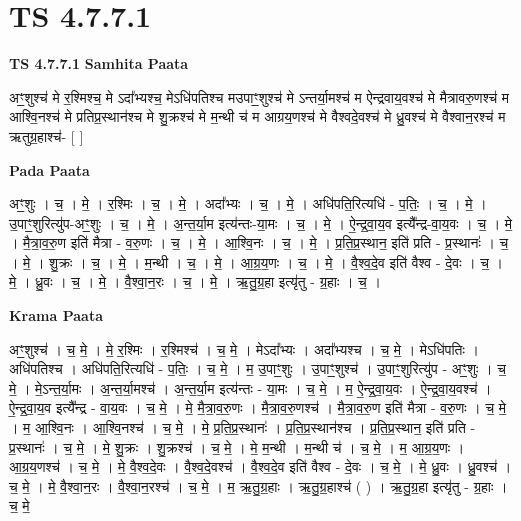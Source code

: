 \documentclass[17pt]{extarticle}
\begin{document}
\section{ TS 4.7.7.1 }

\textbf{TS 4.7.7.1 } \newline
\textbf{Samhita Paata} \newline

अꣳ॒॒शुश्च॑ मे र॒श्मिश्च॒ मे ऽदा᳚भ्यश्च॒ मेऽधि॑पतिश्च मउपाꣳ॒॒शुश्च॑ मे ऽन्तर्या॒मश्च॑ म ऐन्द्रवाय॒वश्च॑ मे मैत्रावरु॒णश्च॑ म आश्वि॒नश्च॑ मे प्रतिप्र॒स्थान॑श्च मे शु॒क्रश्च॑ मे म॒न्थी च॑ म आग्रय॒णश्च॑ मे वैश्वदे॒वश्च॑ मे ध्रु॒वश्च॑ मे वैश्वान॒रश्च॑ म ऋतुग्र॒हाश्च॑- [  ] \newline

\textbf{Pada Paata} \newline

अꣳ॒॒शुः । च॒ । मे॒ । र॒श्मिः । च॒ । मे॒ । अदा᳚भ्यः । च॒ । मे॒ । अधि॑पति॒रित्यधि॑ - प॒तिः॒ । च॒ । मे॒ । उ॒पाꣳ॒॒शुरित्यु॑प-अꣳ॒॒शुः । च॒ । मे॒ । अ॒न्त॒र्या॒म इत्य॑न्तः-या॒मः । च॒ । मे॒ । ऐ॒न्द्र॒वा॒य॒व इत्यै᳚न्द्र-वा॒य॒वः । च॒ । मे॒ । मै॒त्रा॒व॒रु॒ण इति॑ मैत्रा - व॒रु॒णः । च॒ । मे॒ । आ॒श्वि॒नः । च॒ । मे॒ । प्र॒ति॒प्र॒स्थान॒ इति॑ प्रति - प्र॒स्थानः॑ । च॒ । मे॒ । शु॒क्रः । च॒ । मे॒ । म॒न्थी । च॒ । मे॒ । आ॒ग्र॒य॒णः । च॒ । मे॒ । वै॒श्व॒दे॒व इति॑ वैश्व - दे॒वः । च॒ । मे॒ । ध्रु॒वः । च॒ । मे॒ । वै॒श्वा॒न॒रः । च॒ । मे॒ । ऋ॒तु॒ग्र॒हा इत्यृ॑तु - ग्र॒हाः । च॒ ।  \newline


\textbf{Krama Paata} \newline

अꣳ॒॒शुश्च॑ । च॒ मे॒ । मे॒ र॒श्मिः । र॒श्मिश्च॑ । च॒ मे॒ । मेऽदा᳚भ्यः । अदा᳚भ्यश्च । च॒ मे॒ । मेऽधि॑पतिः । अधि॑पतिश्च । अधि॑पति॒रित्यधि॑ - प॒तिः॒ । च॒ मे॒ । म॒ उ॒पाꣳ॒॒शुः । उ॒पाꣳ॒॒शुश्च॑ । उ॒पाꣳ॒॒शुरित्यु॑प - अꣳ॒॒शुः । च॒ मे॒ । मे॒ऽन्त॒र्या॒मः । अ॒न्त॒र्या॒मश्च॑ । अ॒न्त॒र्या॒म इत्य॑न्तः - या॒मः । च॒ मे॒ । म॒ ऐ॒न्द्र॒वा॒य॒वः । ऐ॒न्द्र॒वा॒य॒वश्च॑ । 
ऐ॒न्द्र॒वा॒य॒व इत्यै᳚न्द्र - वा॒य॒वः । च॒ मे॒ । मे॒ मै॒त्रा॒व॒रु॒णः । मै॒त्रा॒व॒रु॒णश्च॑ । मै॒त्रा॒व॒रु॒ण इति॑ मैत्रा - व॒रु॒णः । 
च॒ मे॒ । म॒ आ॒श्वि॒नः । आ॒श्वि॒नश्च॑ । च॒ मे॒ । 
मे॒ प्र॒ति॒प्र॒स्थानः॑ । प्र॒ति॒प्र॒स्थान॑श्च । प्र॒ति॒प्र॒स्थान॒ इति॑ प्रति - प्र॒स्थानः॑ । च॒ मे॒ । मे॒ शु॒क्रः । शु॒क्रश्च॑ । च॒ मे॒ । मे॒ म॒न्थी । म॒न्थी च॑ । च॒ मे॒ । म॒ आ॒ग्र॒य॒णः । आ॒ग्र॒य॒णश्च॑ । च॒ मे॒ । मे॒ वै॒श्व॒दे॒वः । वै॒श्व॒दे॒वश्च॑ । वै॒श्व॒दे॒व इति॑ वैश्व - दे॒वः । च॒ मे॒ । मे॒ ध्रु॒वः । ध्रु॒वश्च॑ । च॒ मे॒ । मे॒ वै॒श्वा॒न॒रः । वै॒श्वा॒न॒रश्च॑ । च॒ मे॒ । म॒ ऋ॒तु॒ग्र॒हाः । ऋ॒तु॒ग्र॒हाश्च॑ ( ) । ऋ॒तु॒ग्र॒हा इत्यृ॑तु - ग्र॒हाः । च॒ मे॒ \newline
\end{document}
